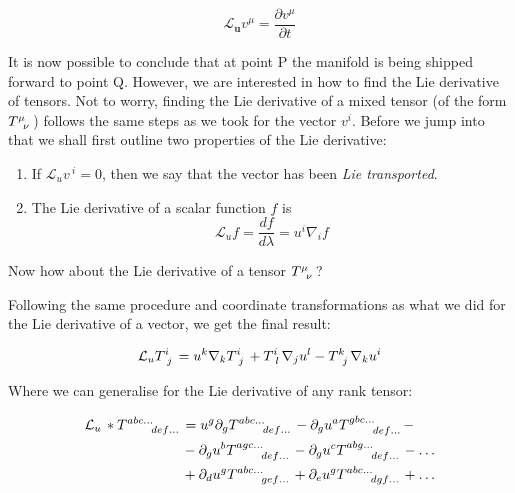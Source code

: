 \documentclass[12pt]{article}
\renewcommand{\vec}[1]{\bm{#1}}
\numberwithin{equation}{section}
\numberwithin{theorem}{subsection}
\begin{document}
\begin{equation}

    \mathcal{L}_{\vec{u}}v^{\mu} = \frac{\partial v^{\mu}}{\partial t}

\end{equation}

It is now possible to conclude that at point P the manifold is being shipped forward to point Q. However, we are interested in how to find the Lie derivative of tensors. Not to worry, finding the Lie derivative of a mixed tensor (of the form $\tensor{T}{^\mu_\nu}$) follows the same steps as we took for the vector $v^{i}$. Before we jump into that we shall first outline two properties of the Lie derivative:

\begin{enumerate}

    \item If $\mathcal{L}_{u} v\,^{i} = 0$, then we say that the vector has been \textit{Lie transported}.

    \item The Lie derivative of a scalar function $f$ is $$\mathcal{L}_{u} f = \frac{df}{d\lambda} = u^{i}\nabla_{i}f$$

\end{enumerate}

Now how about the Lie derivative of a tensor $\tensor{T}{^\mu_\nu}$?

\newline Following the same procedure and coordinate transformations as what we did for the Lie derivative of a vector, we get the final result:

$$\mathcal{L}_{u} \tensor{T}{^i_j} = u^{k}\nabla_{k}\tensor{T}{^i_j} + \tensor{T}{^i_l} \nabla_{j} u^{l} - \tensor{T}{^k_j} \nabla_{k} u^{i} $$

Where we can generalise for the Lie derivative of any rank tensor:

\begin{align}

    \mathcal{L}_{u} \tensor{T}{\,^a^b^c^\dots_d_e_f_\dots} &= u^{g} \partial_{g} \tensor{T}{^a^b^c^\dots_d_e_f_\dots}  - \partial_{g} u^{a}  \tensor{T}{^g^b^c^\dots_d_e_f_\dots} - \notag \\ &- \partial_{g} u^{b} \tensor{T}{^a^g^c^\dots_d_e_f_\dots} - \partial_{g} u^{c} \tensor{T}{^a^b^g^\dots_d_e_f_\dots} - \dots \notag \\

    &+ \partial_{d} u^{g} \tensor{T}{^a^b^c^\dots _g_e_f_\dots} + \partial_{e} u^{g} \tensor{T}{^a^b^c^\dots _d_g_f_\dots} + \dots

    \end{align}
\end{document}
